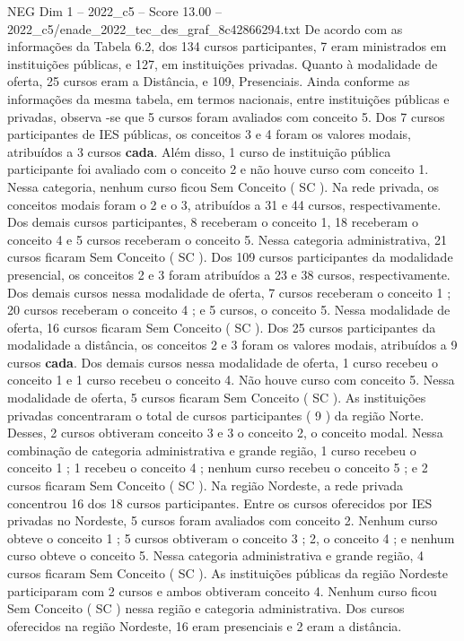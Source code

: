 \begin{textsample}{NEG Dim 1 – 2022\_c5 – Score 13.00 – 2022\_c5/enade\_2022\_tec\_des\_graf\_8c42866294.txt}
De acordo com as informações da Tabela 6.2, dos 134 cursos participantes, 7 eram ministrados em instituições públicas, e 127, em instituições privadas.
Quanto à modalidade de oferta, 25 cursos eram a Distância, e 109, Presenciais.
Ainda conforme as informações da mesma tabela, em termos nacionais, entre instituições públicas e privadas, observa -se que 5 cursos foram avaliados com conceito 5.
Dos 7 cursos participantes de IES públicas, os conceitos 3 e 4 foram os valores modais, atribuídos a 3 cursos \textbf{cada}.
Além disso, 1 curso de instituição pública participante foi avaliado com o conceito 2 e não houve curso com conceito 1.
Nessa categoria, nenhum curso ficou Sem Conceito ( SC ).
Na rede privada, os conceitos modais foram o 2 e o 3, atribuídos a 31 e 44 cursos, respectivamente.
Dos demais cursos participantes, 8 receberam o conceito 1, 18 receberam o conceito 4 e 5 cursos receberam o conceito 5.
Nessa categoria administrativa, 21 cursos ficaram Sem Conceito ( SC ).
Dos 109 cursos participantes da modalidade presencial, os conceitos 2 e 3 foram atribuídos a 23 e 38 cursos, respectivamente.
Dos demais cursos nessa modalidade de oferta, 7 cursos receberam o conceito 1 ; 20 cursos receberam o conceito 4 ; e 5 cursos, o conceito 5.
Nessa modalidade de oferta, 16 cursos ficaram Sem Conceito ( SC ).
Dos 25 cursos participantes da modalidade a distância, os conceitos 2 e 3 foram os valores modais, atribuídos a 9 cursos \textbf{cada}.
Dos demais cursos nessa modalidade de oferta, 1 curso recebeu o conceito 1 e 1 curso recebeu o conceito 4.
Não houve curso com conceito 5.
Nessa modalidade de oferta, 5 cursos ficaram Sem Conceito ( SC ).
As instituições privadas concentraram o total de cursos participantes ( 9 ) da região Norte.
Desses, 2 cursos obtiveram conceito 3 e 3 o conceito 2, o conceito modal.
Nessa combinação de categoria administrativa e grande região, 1 curso recebeu o conceito 1 ; 1 recebeu o conceito 4 ; nenhum curso recebeu o conceito 5 ; e 2 cursos ficaram Sem Conceito ( SC ).
Na região Nordeste, a rede privada concentrou 16 dos 18 cursos participantes.
Entre os cursos oferecidos por IES privadas no Nordeste, 5 cursos foram avaliados com conceito 2.
Nenhum curso obteve o conceito 1 ; 5 cursos obtiveram o conceito 3 ; 2, o conceito 4 ; e nenhum curso obteve o conceito 5.
Nessa categoria administrativa e grande região, 4 cursos ficaram Sem Conceito ( SC ).
As instituições públicas da região Nordeste participaram com 2 cursos e ambos obtiveram conceito 4.
Nenhum curso ficou Sem Conceito ( SC ) nessa região e categoria administrativa.
Dos cursos oferecidos na região Nordeste, 16 eram presenciais e 2 eram a distância.

\end{textsample}
